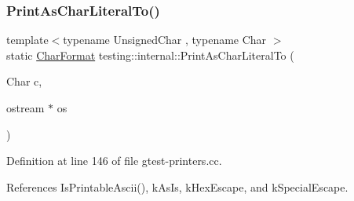 \subsubsection{\texorpdfstring{Print\+As\+Char\+Literal\+To()}{PrintAsCharLiteralTo()}}
{\footnotesize\ttfamily template$<$typename Unsigned\+Char , typename Char $>$ \\
static \hyperlink{namespacetesting_1_1internal_ae2ef98247c76a50cdc80ceb4a6c81793}{Char\+Format} testing\+::internal\+::\+Print\+As\+Char\+Literal\+To (\begin{DoxyParamCaption}\item[{Char}]{c,  }\item[{ostream $\ast$}]{os }\end{DoxyParamCaption})\hspace{0.3cm}{\ttfamily [static]}}



Definition at line 146 of file gtest-\/printers.\+cc.



References Is\+Printable\+Ascii(), k\+As\+Is, k\+Hex\+Escape, and k\+Special\+Escape.


